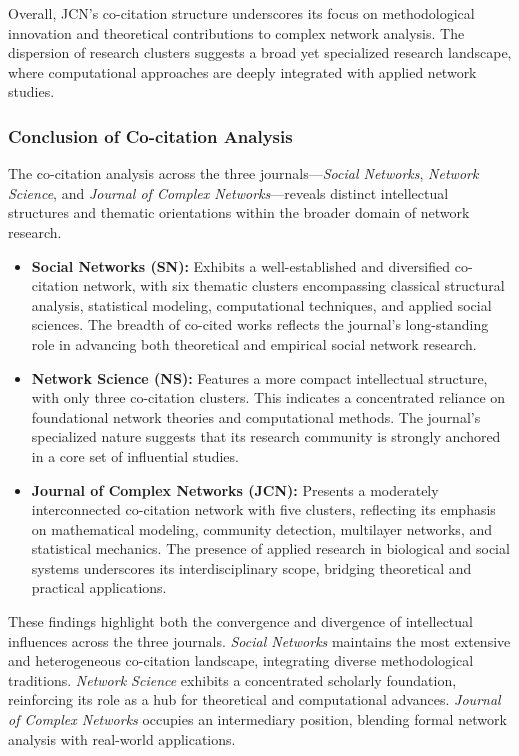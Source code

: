 \documentclass[twocolumn]{article}
\begin{document}
		Overall, JCN’s co-citation structure underscores its focus on methodological innovation and theoretical contributions to complex network analysis. The dispersion of research clusters suggests a broad yet specialized research landscape, where computational approaches are deeply integrated with applied network studies.
		
		\subsubsection*{Conclusion of Co-citation Analysis}
		
		The co-citation analysis across the three journals—\textit{Social Networks}, \textit{Network Science}, and \textit{Journal of Complex Networks}—reveals distinct intellectual structures and thematic orientations within the broader domain of network research.
		
		\begin{itemize}
			\item \textbf{Social Networks (SN):} Exhibits a well-established and diversified co-citation network, with six thematic clusters encompassing classical structural analysis, statistical modeling, computational techniques, and applied social sciences. The breadth of co-cited works reflects the journal’s long-standing role in advancing both theoretical and empirical social network research.
			
			\item \textbf{Network Science (NS):} Features a more compact intellectual structure, with only three co-citation clusters. This indicates a concentrated reliance on foundational network theories and computational methods. The journal’s specialized nature suggests that its research community is strongly anchored in a core set of influential studies.
			
			\item \textbf{Journal of Complex Networks (JCN):} Presents a moderately interconnected co-citation network with five clusters, reflecting its emphasis on mathematical modeling, community detection, multilayer networks, and statistical mechanics. The presence of applied research in biological and social systems underscores its interdisciplinary scope, bridging theoretical and practical applications.
			
		\end{itemize}
		
		These findings highlight both the convergence and divergence of intellectual influences across the three journals. \textit{Social Networks} maintains the most extensive and heterogeneous co-citation landscape, integrating diverse methodological traditions. \textit{Network Science} exhibits a concentrated scholarly foundation, reinforcing its role as a hub for theoretical and computational advances. \textit{Journal of Complex Networks} occupies an intermediary position, blending formal network analysis with real-world applications.
		
\end{document}
